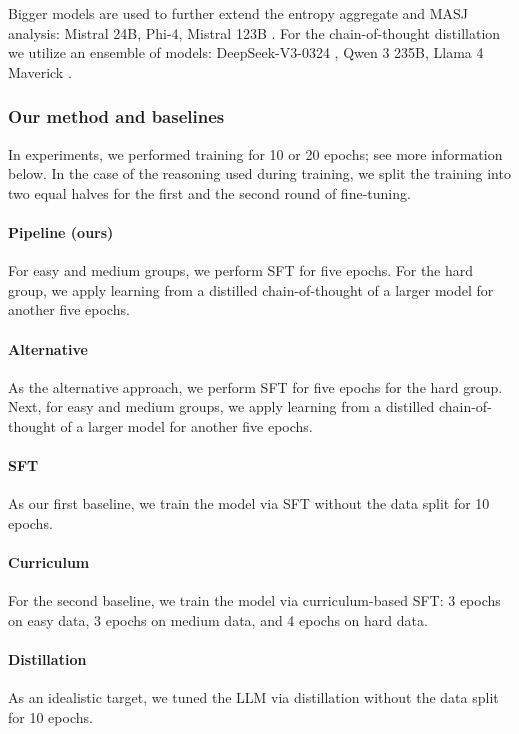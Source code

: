 Bigger models are used to further extend the entropy aggregate and MASJ analysis: Mistral 24B, Phi-4, Mistral 123B \cite{mistral123b}.
For the chain-of-thought distillation we utilize an ensemble of models: DeepSeek-V3-0324 \cite{deepseekai2024deepseekv3technicalreport}, Qwen 3 235B, Llama 4 Maverick \cite{llama4}.

\subsubsection{Our method and baselines}

In experiments, we performed training for 10 or 20 epochs; see more information below.
In the case of the reasoning used during training, we split the training into two equal halves for the first and the second round of fine-tuning.

\paragraph{Pipeline (ours)} For easy and medium groups, we perform SFT for five epochs. For the hard group, we apply learning from a distilled chain-of-thought of a larger model for another five epochs.

\paragraph{Alternative} As the alternative approach, we perform SFT for five epochs for the hard group. Next, for easy and medium groups, we apply learning from a distilled chain-of-thought of a larger model for another five epochs.

\paragraph{SFT} As our first baseline, we train the model via SFT without the data split for 10 epochs. 

\paragraph{Curriculum} For the second baseline, we train the model via curriculum-based SFT: 3 epochs on easy data, 3 epochs on medium data, and 4 epochs on hard data. 

\paragraph{Distillation} As an idealistic target, we tuned the LLM via distillation without the data split for 10 epochs.


